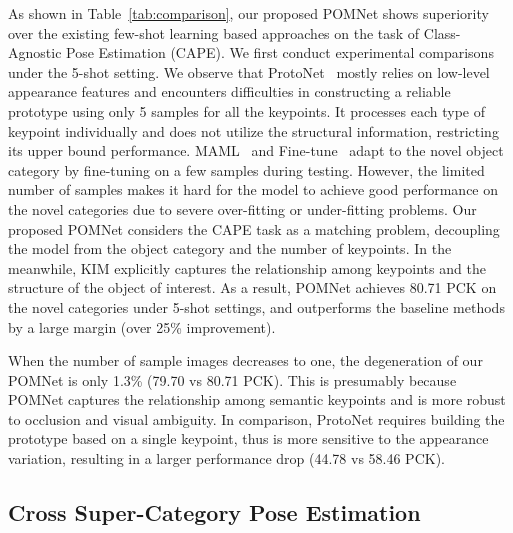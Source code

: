 \documentclass[runningheads]{llncs}
\begin{document}
{As shown in Table~\ref{tab:comparison}, our proposed POMNet shows superiority over the existing few-shot learning based approaches on the task of Class-Agnostic Pose Estimation (CAPE). We first conduct experimental comparisons under the 5-shot setting. 
We observe that ProtoNet~\cite{snell2017prototypical} mostly relies on low-level appearance features and encounters difficulties in constructing a reliable prototype using only 5 samples for all the keypoints. It processes each type of keypoint individually and does not utilize the structural information, restricting its upper bound performance.
MAML~\cite{finn2017model} and Fine-tune~\cite{nakamura2019revisiting} adapt to the novel object category by fine-tuning on a few samples during testing. However, the limited number of samples makes it hard for the model to achieve good performance on the novel categories due to severe over-fitting or under-fitting problems.
Our proposed POMNet considers the CAPE task as a matching problem, decoupling the model from the object category and the number of keypoints. In the meanwhile, KIM explicitly captures the relationship among keypoints and the structure of the object of interest. As a result, POMNet achieves 80.71 PCK on the novel categories under 5-shot settings, and outperforms the baseline methods by a large margin (over 25\% improvement). 

When the number of sample images decreases to one, the degeneration of our POMNet is only 1.3\% (79.70 vs 80.71 PCK). This is presumably because POMNet captures the relationship among semantic keypoints and is more robust to occlusion and visual ambiguity. In comparison, ProtoNet requires building the prototype based on a single keypoint, thus is more sensitive to the appearance variation, resulting in a larger performance drop (44.78 vs 58.46 PCK). 


\subsection{Cross Super-Category Pose Estimation}

}
\end{document}
